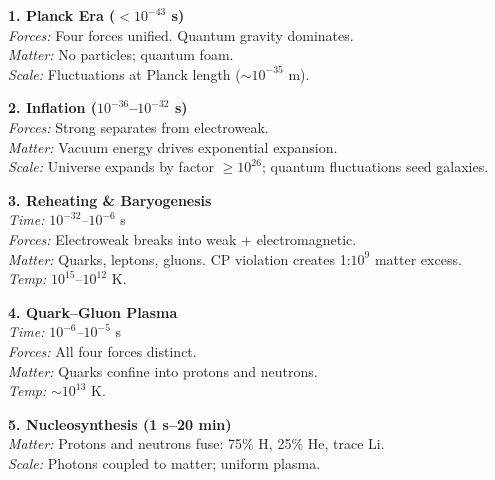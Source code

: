 \begin{center}
\begin{tcolorbox}[
  enhanced,
  breakable,
  width=\textwidth,
  colframe=blue!60!black,
  colback=blue!5,
  colbacktitle=blue!60!black,
  coltitle=white,
  boxrule=0.5pt,
  arc=2mm,
  left=10pt,
  right=10pt,
  top=10pt,
  bottom=10pt,
  title=$\Lambda$CDM Cosmology Timeline,
  fonttitle=\bfseries\large,
  attach boxed title to top left={yshift=-2mm, xshift=5mm},
  boxed title style={arc=1mm, boxrule=0.5pt}
]

\begin{multicols}{2}
\raggedright
\footnotesize
\setlength{\parskip}{3pt}

\textbf{1. Planck Era ($<10^{-43}$ s)}\\
\textit{Forces:} Four forces unified. Quantum gravity dominates.\\
\textit{Matter:} No particles; quantum foam.\\
\textit{Scale:} Fluctuations at Planck length ($\sim10^{-35}$ m).

\textbf{2. Inflation ($10^{-36}$–$10^{-32}$ s)}\\
\textit{Forces:} Strong separates from electroweak.\\
\textit{Matter:} Vacuum energy drives exponential expansion.\\
\textit{Scale:} Universe expands by factor $\geq10^{26}$; quantum fluctuations seed galaxies.

\textbf{3. Reheating \& Baryogenesis}\\
\textit{Time:} $10^{-32}$–$10^{-6}$ s\\
\textit{Forces:} Electroweak breaks into weak + electromagnetic.\\
\textit{Matter:} Quarks, leptons, gluons. CP violation creates 1:$10^9$ matter excess.\\
\textit{Temp:} $10^{15}$–$10^{12}$ K.

\textbf{4. Quark–Gluon Plasma}\\
\textit{Time:} $10^{-6}$–$10^{-5}$ s\\
\textit{Forces:} All four forces distinct.\\
\textit{Matter:} Quarks confine into protons and neutrons.\\
\textit{Temp:} $\sim10^{13}$ K.

\textbf{5. Nucleosynthesis (1 s–20 min)}\\
\textit{Matter:} Protons and neutrons fuse: 75\% H, 25\% He, trace Li.\\
\textit{Scale:} Photons coupled to matter; uniform plasma.


\end{multicols}
\end{tcolorbox}
\end{center}
